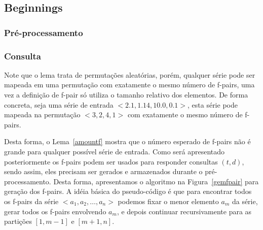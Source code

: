 \documentclass[12pt]{article}
\begin{document}
\subsection{Beginnings}

\subsubsection{Pré-processamento}

\subsubsection{Consulta}















































Note que o lema trata de permutações aleatórias, porém, qualquer série
pode ser mapeada em uma permutação com exatamente o mesmo número de f-pairs,
uma vez a definição de f-pair só utiliza o tamanho relativo dos elementos.
De forma concreta, seja uma série de entrada $<2.1, 1.14, 10.0, 0.1>$, 
esta série pode mapeada na permutação $<3, 2, 4, 1>$ com exatamente o mesmo número de
f-pairs.

Desta forma, o Lema~\ref{amountf} mostra que o número esperado de f-pairs não é grande
para qualquer possível série de entrada. Como será apresentado posteriormente os f-pairs podem ser usados para responder
consultas $(t, d)$, sendo assim, eles precisam ser gerados e armazenados
durante o pré-processamento. Desta forma, apresentamos o algoritmo na Figura~\ref{gemfpair} para geração
dos f-pairs. A idéia básica do pseudo-código é que para encontrar todos os f-pairs da
série $<a_1, a_2, \ldots, a_n>$ podemos fixar o menor elemento $a_m$ da série,
gerar todos os f-pairs envolvendo $a_m$, e depois continuar recursivamente para as partições $[1, m - 1]$ e $[m + 1, n]$.
\end{document}

